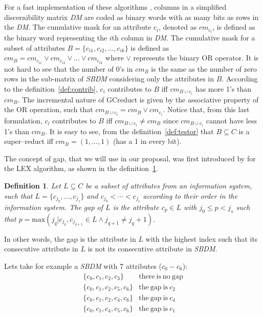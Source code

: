 \documentclass[authoryear,preprint,review,12pt]{elsarticle}
\newtheorem{definition}{Definition}
\begin{document}
	For a fast implementation of these algorithms \citep{Sanchez10,Lias13}, columns in a simplified discernibility matrix \textit{DM} are coded as binary words with as many bits as rows in the \textit{DM}. The cumulative mask for an attribute $c_i$, denoted as $cm_{c_i}$, is defined as the binary word representing the $i$th column in \textit{DM}. The cumulative mask for a subset of attributes $B=\lbrace c_{i1},c_{i2},...,c_{ik} \rbrace$ is defined	as $cm_B = cm_{c_{i1}} \vee cm_{c_{i2}} \vee ... \vee cm_{c_{ik}}$ where $\vee$ represents the binary OR operator. It is not hard to see that the number of 0's in $cm_B$ is the same as the number of zero rows in the sub-matrix of \textit{SBDM} considering only the attributes in $B$. 
	According to the definition~\ref{def:contrib}, $c_i$ contributes to $B$ iff $cm_{B\cup c_i}$ has more 1's than 
	$cm_B$. The incremental nature of GCreduct is given by the associative property of the OR operation, such that 
	$cm_{B\cup c_i}=cm_B\vee cm_{c_i}$. Notice that, from this last formulation, $c_i$ contributes to $B$ iff 
	$cm_{B\cup c_i}\neq cm_B$ since $cm_{B\cup c_i}$ cannot have less 1's than $cm_B$. It is easy to see, from the
	definition~\ref{def:testor} that $B \subseteq C$ is a super--reduct iff $cm_B=(1,...,1)$ (has a 1 in every bit).

	The concept of gap, that we will use in our proposal, was first introduced by \cite{Santiesteban03} for 
	the LEX algorithm, as shown in the definition~\ref{def:gap}.
	
	\begin{definition}\label{def:gap}
		Let $L \subseteq C$ be a subset of attributes from an information system, such that $L = \lbrace c_{j_0},...,c_{j_s}
		\rbrace$ and $c_{j_0}<\cdots <c_{j_s}$ according to their order in the information system. The gap of $L$ is the
		attribute $c_p \in L$ with $j_0 \leq p <	j_s$ such that $p=\mathrm{max}(j_q | c_{j_q},c_{j_{q+1}} \in 
		L \wedge j_{q+1} \neq j_q+1)$.
	\end{definition}
	
	In other words, the gap is the attribute in $L$ with the highest index such that its consecutive attribute in $L$ is not its consecutive attribute in \textit{SBDM}.
	
	Lets take for example a \textit{SBDM} with 7 attributes ($c_0 - c_6$):
	$$\begin{array}{ll}
	\lbrace c_0,c_1,c_2,c_3\rbrace 		& \mathrm{there~is~no~gap}\\
	\lbrace c_0,c_1,c_2,c_5,c_6\rbrace 	& \mathrm{the~gap~is~} c_2\\
	\lbrace c_0,c_1,c_2,c_4,c_6\rbrace 	& \mathrm{the~gap~is~} c_4\\
	\lbrace c_0,c_1,c_4,c_5,c_6\rbrace 	& \mathrm{the~gap~is~} c_1
	\end{array}$$
\end{document}
